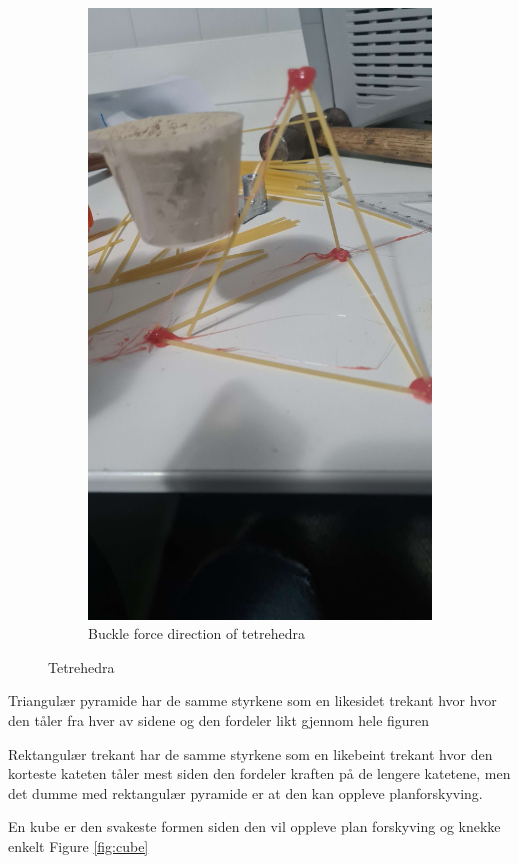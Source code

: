 \documentclass{report}
\begin{document}
\begin{figure}[ht]
\begin{subfigure}{.5\textwidth}
		\label{fig:tetrehedra:a}
	\end{subfigure}%
	\begin{subfigure}{.5\textwidth}
		\centering
		\includegraphics[width=.7\linewidth]{tetrehedra-b}
		\caption{Buckle force direction of tetrehedra}

		\label{fig:tetrehedra:untranslated}
	\end{subfigure}

	\caption{Tetrehedra}
	\label{fig:tetrehedra}
\end{figure}

Triangulær pyramide har de samme styrkene som en likesidet trekant hvor hvor den tåler fra hver av sidene og den fordeler likt gjennom hele figuren

Rektangulær trekant har de samme styrkene som en likebeint trekant hvor den korteste kateten tåler mest siden den fordeler kraften på de lengere katetene, men det dumme med rektangulær pyramide er at den kan oppleve planforskyving.


En kube er den svakeste formen siden den vil oppleve plan forskyving og knekke enkelt Figure \ref{fig:cube}
\end{document}
